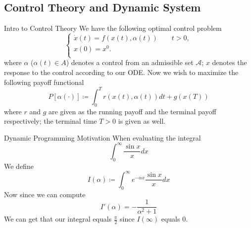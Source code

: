 \documentclass[english]{pkuslide}
\begin{document}
\subsection{Control Theory and Dynamic System}
\begin{frame}{Intro to Control Theory}
We have the following optimal control problem
\begin{equation}
  \left\{
   \begin{array}{l}
   \dot{x}(t) = f(x(t), \alpha(t)) \qquad t>0,  \\
   x(0) = x^0.  \\
   \end{array}
  \right.
\end{equation}
where $\alpha$ ($\alpha(t) \in A$) denotes a control from an admissible set \begin{math}\mathcal{A}\end{math}; $x$ denotes the response to the control according to our ODE. Now we wish to maximize the following payoff functional
\begin{equation}
P[\alpha(\cdot)] \coloneqq \int_{0}^{T} r(x(t), \alpha(t))dt +g(x(T))
\end{equation}
where $r$ and $g$ are given as the running payoff and the terminal payoff respectively; the terminal time $T > 0$ is given as well.
\end{frame}
\begin{frame}{Dynamic Programming} {Motivation}
When evaluating the integral
\begin{equation}
\int_{0}^{\infty} \frac{\sin x}{x} dx \nonumber
\end{equation}
We define 
\begin{equation}
I(\alpha) \coloneqq \int_{0}^{\infty} e^{-\alpha x} \frac{\sin x}{x} dx \nonumber
\end{equation}
Now since we can compute
\begin{equation}
I'(\alpha) = -\frac{1}{\alpha^{2}+1} \nonumber
\end{equation}
We can get that our integral equals $\frac{\pi}{2}$ since $I(\infty)$ equals $0$.
\end{frame}
\end{document}
